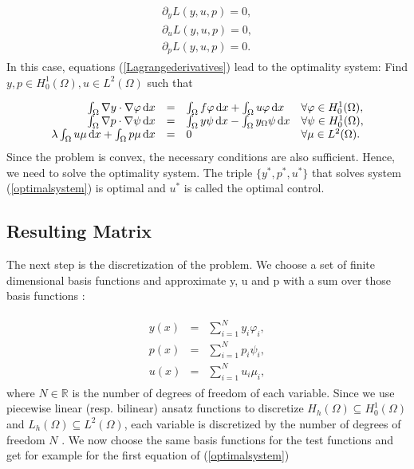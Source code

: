 \documentclass[a4paper, 11pt, twoside]{article}
\begin{document}
\begin{eqnarray}\label{Lagrangederivatives}
\begin{array}{c}
\partial_y L(y,u,p) = 0, \\
\partial_u L(y,u,p) = 0, \\
\partial_p L(y,u,p) = 0.
\end{array}
\end{eqnarray}
In this case, equations (\ref{Lagrangederivatives}) lead to the optimality system: Find $y, p \in H^1_0(\Omega), u \in L^2(\Omega)$ such that

\begin{eqnarray}\label{optimalsystem}\index{optimal system}
\begin{array}{rcll}
\int_\Omega \nabla y\cdot \nabla\varphi\, \dd x &=& \int_\Omega f\varphi\, \dd x + \int_\Omega u\varphi\, \dd x & \forall \varphi\in H_0^1(\Omega), \\
\int_\Omega \nabla p\cdot \nabla\psi\, \dd x &=& \int_\Omega y\psi\, \dd x -\int_\Omega y_{\Omega}\psi\, \dd x & \forall \psi\in H_0^1(\Omega), \\		
\lambda \int_\Omega u\mu\, \dd x + \int_\Omega p\mu\, \dd x &=& 0 & \forall \mu\in L^2(\Omega). \\
\end{array}
\end{eqnarray}
Since the problem is convex, the necessary conditions are also sufficient. Hence, we need to solve the optimality system. The triple $\{y^*, p^*, u^*\}$ that solves system (\ref{optimalsystem}) is optimal and $u^*$ is called the optimal control.


\subsection{Resulting Matrix}
The next step is the discretization of the problem. We choose a set of finite dimensional basis functions and approximate y, u and p with a sum over those basis functions \cite[Chap. 2.12]{troeltzsch}:

\begin{eqnarray}
\begin{array}{rcl}

y(x) &=& \sum_{i=1}^N y_i \varphi_i , \\
p(x) &=& \sum_{i=1}^N p_i \psi_i  , \\
u(x) &=& \sum_{i=1}^N u_i \mu_i ,
\end{array}
\end{eqnarray}
where $N \in \mathbb{R}$ is the number of degrees of freedom of each variable. Since we use piecewise linear (resp. bilinear) ansatz functions to discretize $H_h(\Omega) \subseteq H^1_0(\Omega)$ and $L_h(\Omega) \subseteq L^2(\Omega)$, each variable is discretized by the number of degrees of freedom $N$ . We now choose the same basis functions for the test functions and get for example for the first equation of (\ref{optimalsystem})
\end{document}

